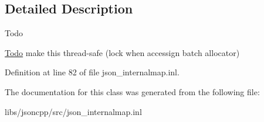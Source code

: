 \subsection{Detailed Description}
\begin{DoxyRefDesc}{Todo}
\item[\hyperlink{todo__todo000002}{Todo}]make this thread-\/safe (lock when accessign batch allocator) \end{DoxyRefDesc}


Definition at line 82 of file json\-\_\-internalmap.\-inl.



The documentation for this class was generated from the following file\-:\begin{DoxyCompactItemize}
\item 
libs/jsoncpp/src/json\-\_\-internalmap.\-inl\end{DoxyCompactItemize}
